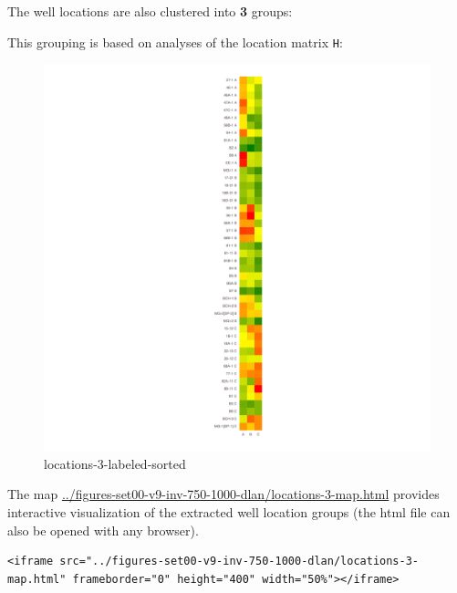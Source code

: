 \documentclass[11pt]{article}
\begin{document}
The well locations are also clustered into \textbf{3} groups:

This grouping is based on analyses of the location matrix \texttt{H}:

\begin{figure}
\centering
\includegraphics{../figures-set00-v9-inv-750-1000-dlan/locations-3-labeled-sorted.png}
\caption{locations-3-labeled-sorted}
\end{figure}

The map \url{../figures-set00-v9-inv-750-1000-dlan/locations-3-map.html}
provides interactive visualization of the extracted well location groups
(the html file can also be opened with any browser).

\begin{verbatim}
<iframe src="../figures-set00-v9-inv-750-1000-dlan/locations-3-map.html" frameborder="0" height="400" width="50%"></iframe>
\end{verbatim}


    
    
    
\end{document}
